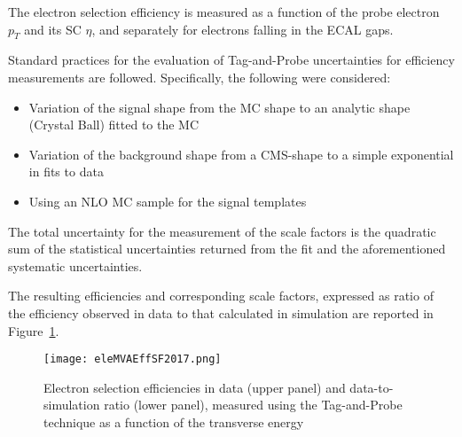 The electron selection efficiency is measured as a function of the probe electron $p_{T}$ and its SC $\eta$, and separately for electrons falling in the ECAL gaps.



Standard practices for the evaluation of Tag-and-Probe uncertainties for efficiency measurements are followed. Specifically, the following were considered:

\begin{itemize}
   \item Variation of the signal shape from the MC shape to an analytic shape (Crystal Ball) fitted to the MC
   \item Variation of the background shape from a CMS-shape to a simple exponential in fits to data
   \item Using an NLO MC sample for the signal templates
\end{itemize}

The total uncertainty for the measurement of the scale factors is the quadratic sum of the statistical uncertainties returned from the fit and the aforementioned systematic uncertainties.

The resulting efficiencies and corresponding scale factors, expressed as ratio of the efficiency observed in data to that calculated in simulation are reported
in Figure~\ref{fig:eleMVAEffSF}.

\begin{figure}
\centering
\texttt{[image: eleMVAEffSF2017.png]}
\caption{Electron selection efficiencies in data (upper panel)
  and data-to-simulation ratio (lower panel),
  measured using the Tag-and-Probe technique
  as a function of the transverse energy}
\label{fig:eleMVAEffSF}
\end{figure}

